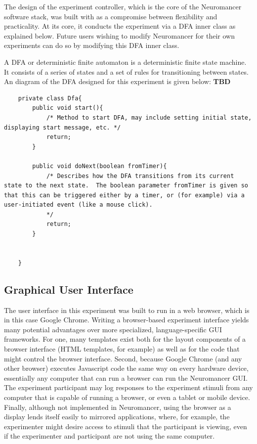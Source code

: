 \documentclass[12pt]{report}
\begin{document}
The design of the experiment controller, which is the core of the Neuromancer software stack, was built with as a compromise between flexibility and practicality.  At its core, it conducts the experiment via a DFA inner class as explained below.  Future users wishing to modify Neuromancer for their own experiments can do so by modifying this DFA inner class.  

A DFA or deterministic finite automaton is a deterministic finite state machine.  It consists of a series of states and a set of rules for transitioning between states.  An diagram of the DFA designed for this experiment is given below: {\bf TBD}

\begin{lstlisting}
	private class Dfa{
		public void start(){
			/* Method to start DFA, may include setting initial state, displaying start message, etc. */
			return;
		}
		
		public void doNext(boolean fromTimer){
			/* Describes how the DFA transitions from its current state to the next state.  The boolean parameter fromTimer is given so that this can be triggered either by a timer, or (for example) via a user-initiated event (like a mouse click).
			*/
			return;
		}
		
		
	}
\end{lstlisting}

\subsection{Graphical User Interface}
	The user interface in this experiment was built to run in a web browser, which is in this case Google Chrome.  Writing a browser-based experiment interface yields many potential advantages over more specialized, language-specific GUI frameworks.  For one, many templates exist both for the layout components of a browser interface (HTML templates, for example) as well as for the code that might control the browser interface.  Second, because Google Chrome (and any other browser) executes Javascript code the same way on every hardware device, essentially any computer that can run a browser can run the Neuromancer GUI.  The experiment participant may log responses to the experiment stimuli from any computer that is capable of running a browser, or even a tablet or mobile device.  Finally, although not implemented in Neuromancer, using the browser as a display lends itself easily to mirrored applications, where, for example, the experimenter might desire access to stimuli that the participant is viewing, even if the experimenter and participant are not using the same computer.
\end{document}
